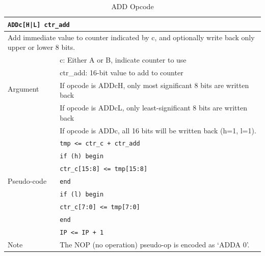 \documentclass[main\_\_EN.tex]{subfiles}
\begin{document}
\begin{table}[H]
\caption{ADD Opcode}
\label{tab:bitscrm-add-opcode}
\begin{tabular}{|l|l|}
\hline
\multicolumn{2}{|l|}{\texttt{ADDc[H|L] ctr\_add}} \\
\hline
\multicolumn{2}{|L{17cm}|}{Add immediate value to counter indicated by c, and optionally write back only upper or lower 8 bits.} \\
\hline
\multirow{4}{*}{Argument} & c: Either A or B, indicate counter to use \\
& ctr\_add: 16-bit value to add to counter \\
& If opcode is ADDcH, only most significant 8 bits are written back \\
& If opcode is ADDcL, only least-significant 8 bits are written back \\
& If opcode is ADDc, all 16 bits will be written back (h=1, l=1). \\
\hline
\multirow{7}{*}{Pseudo-code} & \texttt{tmp <= ctr\_c + ctr\_add} \\
& \texttt{if (h) begin} \\
& \hspace*{4mm} \texttt{ctr\_c[15:8] <= tmp[15:8]} \\
& \texttt{end} \\
& \texttt{if (l) begin} \\
& \hspace*{4mm} \texttt{ctr\_c[7:0] <= tmp[7:0]} \\
& \texttt{end} \\
& \texttt{IP <= IP + 1} \\
\hline
Note & The NOP (no operation) pseudo-op is encoded as ‘ADDA 0’. \\
\hline
\end{tabular}
\end{table}
\end{document}
